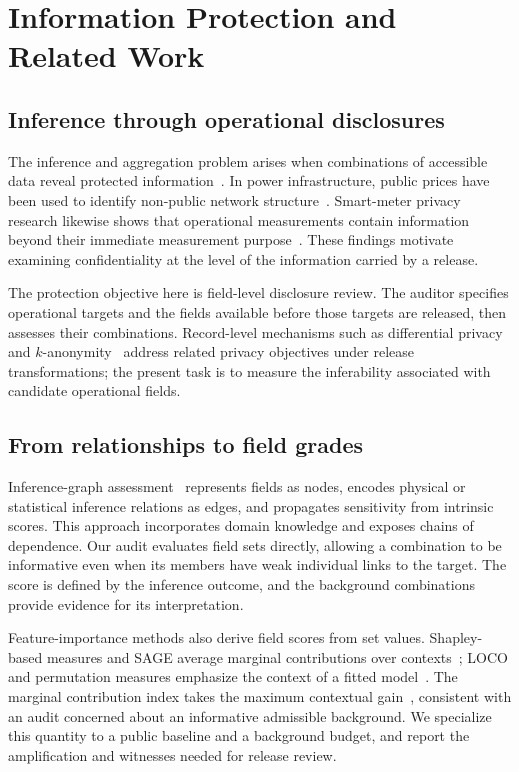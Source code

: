 \section{Information Protection and Related Work}\label{sec:related}
\subsection{Inference through operational disclosures}
The inference and aggregation problem arises when combinations of accessible data reveal protected information~\cite{lunt1989aggregation,farkas2002inference}. In power infrastructure, public prices have been used to identify non-public network structure~\cite{kekatos2014topology}. Smart-meter privacy research likewise shows that operational measurements contain information beyond their immediate measurement purpose~\cite{mcdaniel2009smartgrid,giaconi2018smartmeter}. These findings motivate examining confidentiality at the level of the information carried by a release.

The protection objective here is field-level disclosure review. The auditor specifies operational targets and the fields available before those targets are released, then assesses their combinations. Record-level mechanisms such as differential privacy and $k$-anonymity~\cite{dwork2014dp,sweeney2002kanonymity} address related privacy objectives under release transformations; the present task is to measure the inferability associated with candidate operational fields.

\subsection{From relationships to field grades}
Inference-graph assessment~\cite{hu2026ignn} represents fields as nodes, encodes physical or statistical inference relations as edges, and propagates sensitivity from intrinsic scores. This approach incorporates domain knowledge and exposes chains of dependence. Our audit evaluates field sets directly, allowing a combination to be informative even when its members have weak individual links to the target. The score is defined by the inference outcome, and the background combinations provide evidence for its interpretation.

Feature-importance methods also derive field scores from set values. Shapley-based measures and SAGE average marginal contributions over contexts~\cite{shapley1953value,lundberg2017shap,covert2020sage,williamson2020spvim}; LOCO and permutation measures emphasize the context of a fitted model~\cite{lei2018loco,breiman2001rf,fisher2019mcr,hooker2021unrestricted}. The marginal contribution index takes the maximum contextual gain~\cite{catav2021mci}, consistent with an audit concerned about an informative admissible background. We specialize this quantity to a public baseline and a background budget, and report the amplification and witnesses needed for release review.

